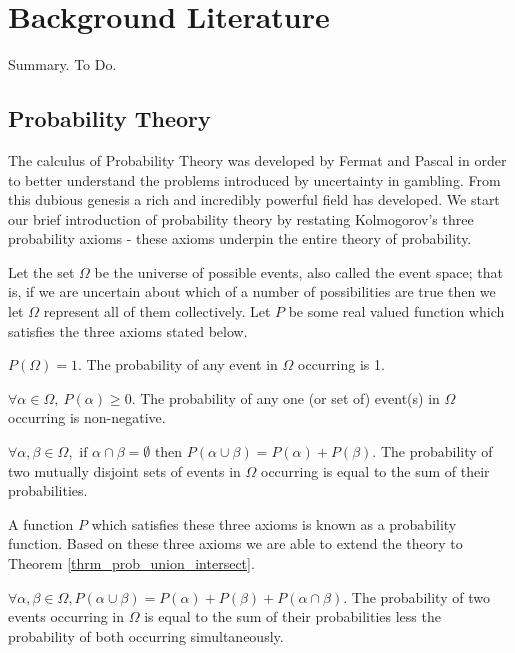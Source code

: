 \documentclass[../masters.tex]{subfiles}
\begin{document}
\graphicspath{{./imgs/}{../imgs/}} %

\section{Background Literature}
Summary. To Do.

\subsection{Probability Theory}
The calculus of Probability Theory was developed by Fermat and Pascal in order to better understand the problems introduced by uncertainty in gambling. From this dubious genesis a rich and incredibly powerful field has developed. We start our brief introduction of probability theory by restating Kolmogorov's three probability axioms - these axioms underpin the entire theory of probability.

Let the set $\Omega$ be the universe of possible events, also called the event space; that is, if we are uncertain about which of a number of possibilities are true then we let $\Omega$ represent all of them collectively. Let $P$ be some real valued function which satisfies the three axioms stated below.
\begin{ax}
$P(\Omega) = 1$. The probability of any event in $\Omega$ occurring is 1.
\end{ax}
\begin{ax}
$\forall \alpha \in \Omega,~P(\alpha) \geq 0$. The probability of any one (or set of) event(s) in $\Omega$ occurring is non-negative. 
\end{ax}
\begin{ax}
$\forall \alpha, \beta \in \Omega,\text{ if } \alpha \cap \beta = \emptyset \text{ then } P(\alpha \cup \beta) = P(\alpha) + P(\beta)$. The probability of two mutually disjoint sets of events in $\Omega$ occurring is equal to the sum of their probabilities.
\end{ax}
A function $P$ which satisfies these three axioms is known as a probability function. Based on these three axioms we are able to extend the theory to Theorem \ref{thrm_prob_union_intersect}.
\begin{thrm}
$\forall \alpha, \beta \in \Omega, P(\alpha \cup \beta) = P(\alpha) + P(\beta) + P(\alpha \cap \beta)$. The probability of two events occurring in $\Omega$ is equal to the sum of their probabilities less the probability of both occurring simultaneously.
\label{thrm_prob_union_intersect}
\end{thrm}
\end{document}
